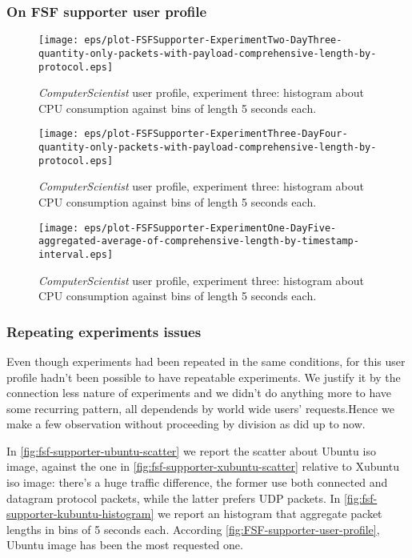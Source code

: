 \documentclass[10pt,a4paper]{article}
\begin{document}
    \newpage

    \subsubsection{On FSF supporter user profile}

    \begin{figure}
      \centering
      \texttt{[image: eps/plot-FSFSupporter-ExperimentTwo-DayThree-quantity-only-packets-with-payload-comprehensive-length-by-protocol.eps]}
      \caption{\emph{ComputerScientist} user profile, experiment
        three: histogram about CPU consumption against bins of length 5
        seconds each.}
      \label{fig:fsf-supporter-ubuntu-scatter}
    \end{figure}

    \begin{figure}
      \centering
      \texttt{[image: eps/plot-FSFSupporter-ExperimentThree-DayFour-quantity-only-packets-with-payload-comprehensive-length-by-protocol.eps]}
      \caption{\emph{ComputerScientist} user profile, experiment
        three: histogram about CPU consumption against bins of length 5
        seconds each.}
      \label{fig:fsf-supporter-xubuntu-scatter}
    \end{figure}

    \begin{figure}
      \centering
      \texttt{[image: eps/plot-FSFSupporter-ExperimentOne-DayFive-aggregated-average-of-comprehensive-length-by-timestamp-interval.eps]}
      \caption{\emph{ComputerScientist} user profile, experiment
        three: histogram about CPU consumption against bins of length 5
        seconds each.}
      \label{fig:fsf-supporter-kubuntu-histogram}
    \end{figure}

    \subsubsection*{Repeating experiments issues}
    
    Even though experiments had been repeated in the same conditions,
    for this user profile hadn't been possible to have repeatable
    experiments. We justify it by the connection less nature of
    experiments and we didn't do anything more to have some recurring
    pattern, all dependends by world wide users' requests.Hence we
    make a few observation without proceeding by division as did up to
    now.

    In
    \autoref{fig:fsf-supporter-ubuntu-scatter}
    we report the scatter about Ubuntu iso image, against the one in
    \autoref{fig:fsf-supporter-xubuntu-scatter} relative to Xubuntu iso
    image: there's a huge traffic difference, the former use both
    connected and datagram protocol packets, while the latter prefers
    UDP packets. In \autoref{fig:fsf-supporter-kubuntu-histogram} we
    report an histogram that aggregate packet lengths in bins of 5
    seconds each. According \autoref{fig:FSF-supporter-user-profile},
    Ubuntu image has been the most requested one.
\end{document}
